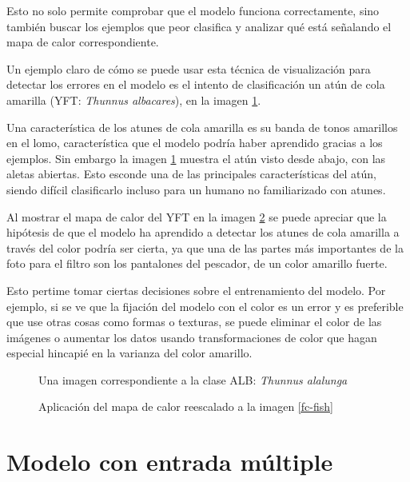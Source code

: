 Esto no solo permite comprobar que el modelo funciona correctamente, sino también buscar los ejemplos que peor clasifica y analizar qué está señalando el mapa de calor correspondiente.

Un ejemplo claro de cómo se puede usar esta técnica de visualización para detectar los errores en el modelo es el intento de clasificación un atún de cola amarilla (YFT: \textit{Thunnus albacares}), en la imagen \ref{yft}.

Una característica de los atunes de cola amarilla es su banda de tonos amarillos en el lomo, característica que el modelo podría haber aprendido gracias a los ejemplos. Sin embargo la imagen \ref{yft} muestra el atún visto desde abajo, con las aletas abiertas. Esto esconde una de las principales características del atún, siendo difícil clasificarlo incluso para un humano no familiarizado con atunes.

Al mostrar el mapa de calor del YFT en la imagen \ref{yft-heatmap} se puede apreciar que la hipótesis de que el modelo ha aprendido a detectar los atunes de cola amarilla a través del color podría ser cierta, ya que una de las partes más importantes de la foto para el filtro son los pantalones del pescador, de un color amarillo fuerte.

Esto pertime tomar ciertas decisiones sobre el entrenamiento del modelo. Por ejemplo, si se ve que la fijación del modelo con el color es un error y es preferible que use otras cosas como formas o texturas, se puede eliminar el color de las imágenes o aumentar los datos usando transformaciones de color que hagan especial hincapié en la varianza del color amarillo.

\begin{figure}
    \caption{Una imagen correspondiente a la clase ALB: \textit{Thunnus alalunga}}
\label{yft}
\end{figure}

\begin{figure}
    \caption{Aplicación del mapa de calor reescalado a la imagen \ref{fc-fish}}
\label{yft-heatmap}
\end{figure}

\section{Modelo con entrada múltiple}
\label{sec:multi_entry}

